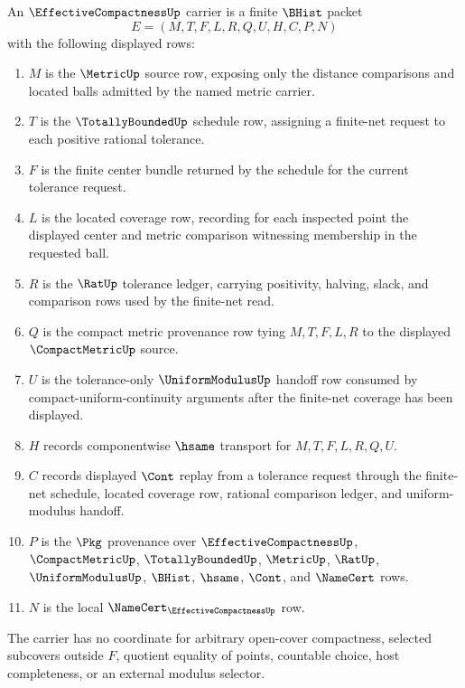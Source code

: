 \begin{definition}
\label{def:effective-compactness-carrier}
An $\EffectiveCompactnessUp$ carrier is a finite $\BHist$ packet
$$
E=(M,T,F,L,R,Q,U,H,C,P,N)
$$
with the following displayed rows:
\begin{enumerate}
\item $M$ is the $\MetricUp$ source row, exposing only the distance comparisons and located balls admitted by the named metric carrier.
\item $T$ is the $\TotallyBoundedUp$ schedule row, assigning a finite-net request to each positive rational tolerance.
\item $F$ is the finite center bundle returned by the schedule for the current tolerance request.
\item $L$ is the located coverage row, recording for each inspected point the displayed center and metric comparison witnessing membership in the requested ball.
\item $R$ is the $\RatUp$ tolerance ledger, carrying positivity, halving, slack, and comparison rows used by the finite-net read.
\item $Q$ is the compact metric provenance row tying $M,T,F,L,R$ to the displayed $\CompactMetricUp$ source.
\item $U$ is the tolerance-only $\UniformModulusUp$ handoff row consumed by compact-uniform-continuity arguments after the finite-net coverage has been displayed.
\item $H$ records componentwise $\hsame$ transport for $M,T,F,L,R,Q,U$.
\item $C$ records displayed $\Cont$ replay from a tolerance request through the finite-net schedule, located coverage row, rational comparison ledger, and uniform-modulus handoff.
\item $P$ is the $\Pkg$ provenance over $\EffectiveCompactnessUp$, $\CompactMetricUp$, $\TotallyBoundedUp$, $\MetricUp$, $\RatUp$, $\UniformModulusUp$, $\BHist$, $\hsame$, $\Cont$, and $\NameCert$ rows.
\item $N$ is the local $\NameCert_{\EffectiveCompactnessUp}$ row.
\end{enumerate}
The carrier has no coordinate for arbitrary open-cover compactness, selected subcovers outside $F$, quotient equality of points, countable choice, host completeness, or an external modulus selector.
\end{definition}

